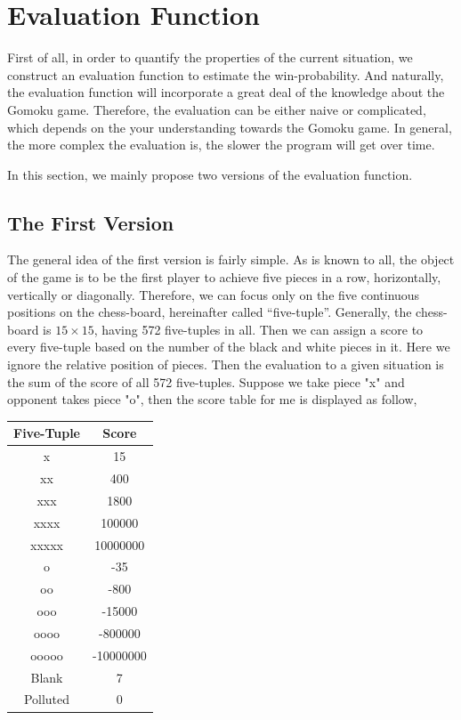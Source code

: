 \documentclass[12pt,a4paper]{article}
\begin{document}
\section{Evaluation Function}
First of all, in order to quantify the properties of the current situation, we construct an evaluation function to estimate the win-probability. And naturally, the evaluation function will incorporate a great deal of the knowledge about the Gomoku game. Therefore, the evaluation can be either naive or complicated, which depends on the your understanding towards the Gomoku game. In general, the more complex the evaluation is, the slower the program will get over time.

In this section, we mainly propose two versions of the evaluation function.

\subsection{The First Version}
The general idea of the first version is fairly simple. As is known to all, the object of the game is to be the first player to achieve five pieces in a row, horizontally, vertically or diagonally. Therefore, we can focus only on the five continuous positions on the chess-board, hereinafter called ``five-tuple''. Generally, the chess-board is $15\times 15$, having 572 five-tuples in all. Then we can assign a score to every five-tuple based on the number of the black and white pieces in it. Here we ignore the relative position of pieces. Then the evaluation to a given situation is the sum of the score of all 572 five-tuples. Suppose we take piece "x" and opponent takes piece "o", then the score table for me is displayed as follow,
\begin{table}[h]
\centering
\begin{tabular}{c|c}
\hline
Five-Tuple&Score \\
\hline
x&15\\
xx&400\\
xxx&1800\\
xxxx&100000\\
xxxxx&10000000\\
o&-35\\
oo&-800\\
ooo&-15000\\
oooo&-800000\\
ooooo&-10000000\\
Blank&7\\
Polluted&0\\
\hline
\end{tabular}
\end{table}
\end{document}
